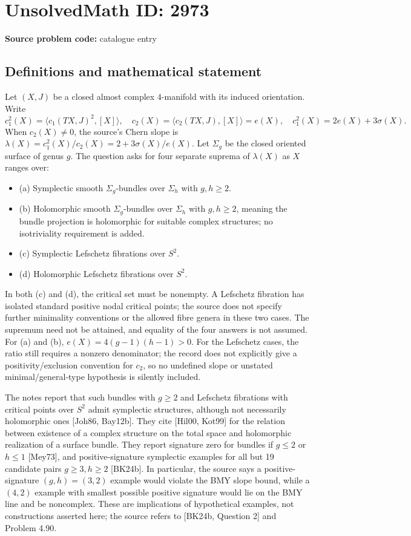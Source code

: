 \documentclass[11pt]{article}
\begin{document}
\section*{UnsolvedMath ID: 2973}
\textbf{Source problem code:} catalogue entry
\subsection{Definitions and mathematical statement}
Let $(X,J)$ be a closed almost complex $4$-manifold with its induced orientation. Write
\[c_1^2(X)=\langle c_1(TX,J)^2,[X]\rangle,\quad c_2(X)=\langle c_2(TX,J),[X]\rangle=e(X),\quad c_1^2(X)=2e(X)+3\sigma(X).\]
When $c_2(X)\ne0$, the source's Chern slope is $\lambda(X)=c_1^2(X)/c_2(X)=2+3\sigma(X)/e(X)$. Let $\Sigma_g$ be the closed oriented surface of genus $g$. The question asks for four separate suprema of $\lambda(X)$ as $X$ ranges over:
\begin{itemize}
\item (a) Symplectic smooth $\Sigma_g$-bundles over $\Sigma_h$ with $g,h\geq2$.
\item (b) Holomorphic smooth $\Sigma_g$-bundles over $\Sigma_h$ with $g,h\geq2$, meaning the bundle projection is holomorphic for suitable complex structures; no isotriviality requirement is added.
\item (c) Symplectic Lefschetz fibrations over $S^2$.
\item (d) Holomorphic Lefschetz fibrations over $S^2$.
\end{itemize}
In both (c) and (d), the critical set must be nonempty. A Lefschetz fibration has isolated standard positive nodal critical points; the source does not specify further minimality conventions or the allowed fibre genera in these two cases. The supremum need not be attained, and equality of the four answers is not assumed. For (a) and (b), $e(X)=4(g-1)(h-1)>0$. For the Lefschetz cases, the ratio still requires a nonzero denominator; the record does not explicitly give a positivity/exclusion convention for $c_2$, so no undefined slope or unstated minimal/general-type hypothesis is silently included.

The notes report that such bundles with $g\geq2$ and Lefschetz fibrations with critical points over $S^2$ admit symplectic structures, although not necessarily holomorphic ones [Joh86, Bay12b]. They cite [Hil00, Kot99] for the relation between existence of a complex structure on the total space and holomorphic realization of a surface bundle. They report signature zero for bundles if $g\leq2$ or $h\leq1$ [Mey73], and positive-signature symplectic examples for all but 19 candidate pairs $g\geq3,h\geq2$ [BK24b]. In particular, the source says a positive-signature $(g,h)=(3,2)$ example would violate the BMY slope bound, while a $(4,2)$ example with smallest possible positive signature would lie on the BMY line and be noncomplex. These are implications of hypothetical examples, not constructions asserted here; the source refers to [BK24b, Question 2] and Problem 4.90.
\end{document}
